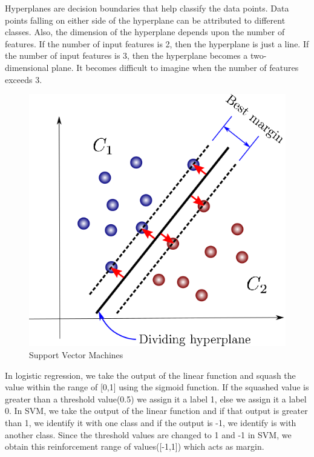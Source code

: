\documentclass[12pt]{article}
\begin{document}
Hyperplanes are decision boundaries that help classify the data points. Data points falling on either side of the hyperplane can be attributed to different classes. Also, the dimension of the hyperplane depends upon the number of features. If the number of input features is 2, then the hyperplane is just a line. If the number of input features is 3, then the hyperplane becomes a two-dimensional plane. It becomes difficult to imagine when the number of features exceeds 3.

\begin{center}
\begin{figure}[h]
\centerline{\includegraphics[scale=.35]{IMG_8207.png}}
\caption{Support Vector Machines}
\end{figure}
\end{center}

In logistic regression, we take the output of the linear function and squash the value within the range of [0,1] using the sigmoid function. If the squashed value is greater than a threshold value(0.5) we assign it a label 1, else we assign it a label 0. In SVM, we take the output of the linear function and if that output is greater than 1, we identify it with one class and if the output is -1, we identify is with another class. Since the threshold values are changed to 1 and -1 in SVM, we obtain this reinforcement range of values([-1,1]) which acts as margin.
\end{document}
